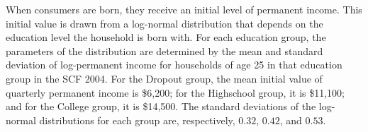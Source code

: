 \documentclass[\econtexRoot/EGMN]{subfiles}
\begin{document}

When consumers are born, they receive an initial level of permanent income. This initial value is drawn from a log-normal distribution that depends on the education level the household is born with. For each education group, the parameters of the distribution are determined by the mean and standard deviation of log-permanent income for households of age 25 in that education group in the SCF 2004. For the Dropout group, the mean initial value of quarterly permanent income is \$6,200; for the Highschool group, it is \$11,100; and for the College group, it is \$14,500. The standard deviations of the log-normal distributions for each group are, respectively, $0.32$, $0.42$, and $0.53$.
\end{document}
